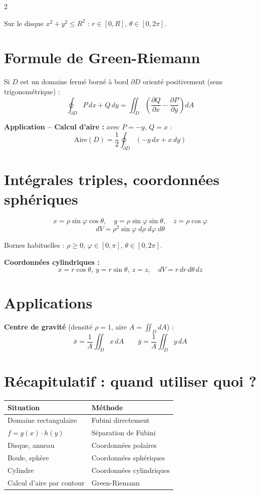 \documentclass[10pt,a4paper]{article}
\begin{document}
\begin{multicols}{2}
\begin{grisbox}
Sur le disque $x^2+y^2\le R^2$ : $r\in[0,R]$, $\theta\in[0,2\pi]$.
\end{grisbox}

\section{Formule de Green-Riemann}

\begin{theobox}
Si $D$ est un domaine fermé borné à bord $\partial D$ orienté positivement (sens trigonométrique) :
$$\boxed{\oint_{\partial D} P\,dx + Q\,dy = \iint_D \left(\frac{\partial Q}{\partial x}-\frac{\partial P}{\partial y}\right)dA}$$

\textbf{Application -- Calcul d'aire :} avec $P=-y$, $Q=x$ :
$$\mathrm{Aire}(D) = \frac{1}{2}\oint_{\partial D}(-y\,dx+x\,dy)$$
\end{theobox}

\section{Intégrales triples, coordonnées sphériques}

\begin{grisbox}
$$x=\rho\sin\varphi\cos\theta,\quad y=\rho\sin\varphi\sin\theta,\quad z=\rho\cos\varphi$$
$$dV = \rho^2\sin\varphi\;d\rho\;d\varphi\;d\theta$$

Bornes habituelles : $\rho\ge 0$, $\varphi\in[0,\pi]$, $\theta\in[0,2\pi]$.

\textbf{Coordonnées cylindriques :}
$$x=r\cos\theta,\ y=r\sin\theta,\ z=z,\quad dV=r\,dr\,d\theta\,dz$$
\end{grisbox}

\section{Applications}

\textbf{Centre de gravité} (densité $\rho=1$, aire $A=\iint_D dA$) :
$$\bar{x} = \frac{1}{A}\iint_D x\,dA \qquad \bar{y} = \frac{1}{A}\iint_D y\,dA$$

\section{Récapitulatif : quand utiliser quoi ?}

\begin{grisbox}
\renewcommand{\arraystretch}{1.3}
\begin{tabular}{@{}lp{5cm}@{}}
\textbf{Situation} & \textbf{Méthode} \\
\hline
Domaine rectangulaire & Fubini directement \\
$f=g(x)\cdot h(y)$ & Séparation de Fubini \\
Disque, anneau & Coordonnées polaires \\
Boule, sphère & Coordonnées sphériques \\
Cylindre & Coordonnées cylindriques \\
Calcul d'aire par contour & Green-Riemann \\
\end{tabular}
\end{grisbox}


\end{multicols}
\end{document}
